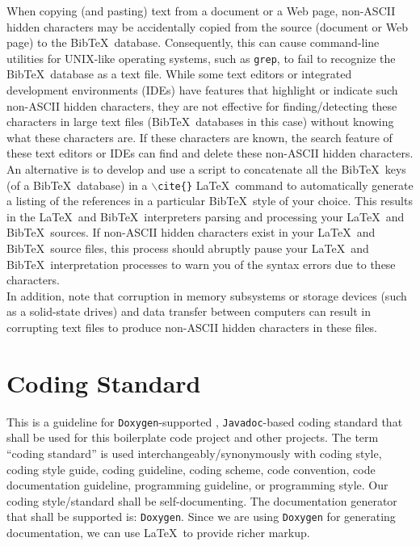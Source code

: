 \documentclass[letter,12pt]{article}
\begin{document}
When copying (and pasting) text from a document or a Web page, non-ASCII hidden characters may be accidentally copied from the source (document or Web page) to the {\sc Bib}\TeX\ database. Consequently, this can cause command-line utilities for UNIX-like operating systems, such as {\tt grep}, to fail to recognize the {\sc Bib}\TeX\ database as a text file. While some text editors or integrated development environments (IDEs) have features that highlight or indicate such non-ASCII hidden characters, they are not effective for finding/detecting these characters in large text files ({\sc Bib}\TeX\ databases in this case) without knowing what these characters are. If these characters are known, the search feature of these text editors or IDEs can find and delete these non-ASCII hidden characters. \\

An alternative is to develop and use a script to concatenate all the {\sc Bib}\TeX\ keys (of a {\sc Bib}\TeX\ database) in a {\tt $\backslash$cite\{\}} \LaTeX\ command to automatically generate a listing of the references in a particular {\sc Bib}\TeX\ style of your choice. This results in the \LaTeX\ and {\sc Bib}\TeX\ interpreters parsing and processing your \LaTeX\ and {\sc Bib}\TeX\ sources. If non-ASCII hidden characters exist in your \LaTeX\ and {\sc Bib}\TeX\ source files, this process should abruptly pause your \LaTeX\ and {\sc Bib}\TeX\ interpretation processes to warn you of the syntax errors due to these characters. \\

In addition, note that corruption in memory subsystems or storage devices (such as a solid-state drives) and data transfer between computers can result in corrupting text files to produce non-ASCII hidden characters in these files.





\section{Coding Standard}
\label{sec:CodingStandard}

This is a guideline for {\tt Doxygen}-supported \cite{vanHeesch2016}, {\tt Javadoc}-based \cite{Long1995} coding standard that shall be used for this boilerplate code project and other projects. The term ``coding standard'' is used interchangeably/synonymously with coding style, coding style guide, coding guideline, coding scheme, code convention, code documentation guideline, programming guideline, or programming style. Our coding style/standard shall be self-documenting. The documentation generator that shall be supported is: {\tt Doxygen}. Since we are using {\tt Doxygen} for generating documentation, we can use \LaTeX\ to provide richer markup. \\
\end{document}
